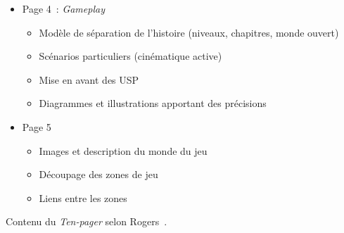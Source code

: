 \begin{table}[H]
\begin{framed}
\begin{itemize}
\begin{itemize}
    \end{itemize}
    \item Page 4~: \emph{Gameplay}
    \begin{itemize}
        \item Modèle de séparation de l'histoire (niveaux, chapitres, monde ouvert)
        \item Scénarios particuliers (cinématique active)
        \item Mise en avant des USP
        \item Diagrammes et illustrations apportant des précisions
    \end{itemize}
    \item Page 5
    \begin{itemize}
        \item Images et description du monde du jeu
        \item Découpage des zones de jeu
        \item Liens entre les zones
    \end{itemize}

\end{itemize}
\end{framed}
\caption{Contenu du \emph{Ten-pager} selon Rogers~\cite{LevelUpRogers2014}.}
\end{table}

\addtocounter{table}{-1}

